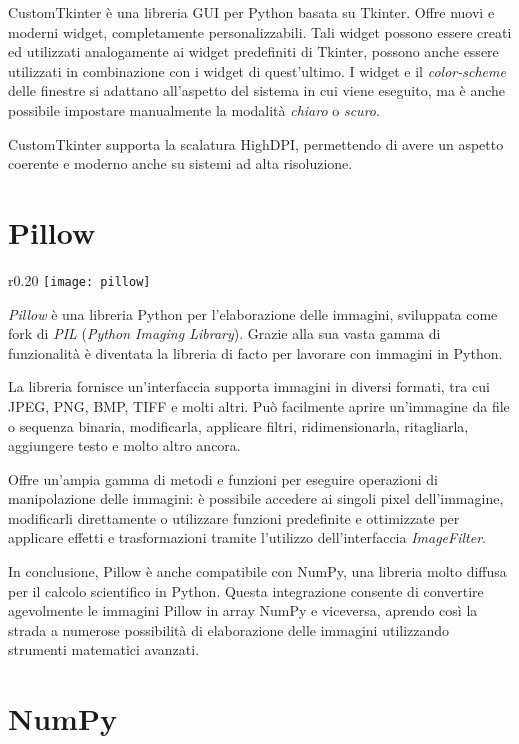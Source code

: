 {{CustomTkinter è una libreria GUI per Python basata su Tkinter. Offre nuovi e moderni widget, completamente personalizzabili. Tali widget possono essere creati ed utilizzati analogamente ai widget predefiniti di Tkinter, possono anche essere utilizzati in combinazione con i widget di quest'ultimo. I widget e il \textit{color-scheme} delle finestre si adattano all'aspetto del sistema in cui viene eseguito, ma è anche possibile impostare manualmente la modalità \textit{chiaro} o \textit{scuro}.

CustomTkinter supporta la scalatura HighDPI, permettendo di avere un aspetto coerente e moderno anche su sistemi ad alta risoluzione.

{\section{Pillow}
	
	\begin{wrapfigure}{r}{0.20\textwidth}
		\centering
		\texttt{[image: pillow]}
	\end{wrapfigure}
	\textit{Pillow} è una libreria Python per l'elaborazione delle immagini, sviluppata come fork di \textit{PIL} (\textit{Python Imaging Library}). Grazie alla sua vasta gamma di funzionalità è diventata la libreria di facto per lavorare con immagini in Python.
	
	La libreria fornisce un'interfaccia supporta immagini in diversi formati, tra cui JPEG, PNG, BMP, TIFF e molti altri. Può facilmente aprire un'immagine da file o sequenza binaria, modificarla, applicare filtri, ridimensionarla, ritagliarla, aggiungere testo e molto altro ancora.
	
	Offre un'ampia gamma di metodi e funzioni per eseguire operazioni di manipolazione delle immagini: è possibile accedere ai singoli pixel dell'immagine, modificarli direttamente o utilizzare funzioni predefinite e ottimizzate per applicare effetti e trasformazioni tramite l'utilizzo dell'interfaccia \textit{ImageFilter}.
	
	In conclusione, Pillow è anche compatibile con NumPy, una libreria molto diffusa per il calcolo scientifico in Python. Questa integrazione consente di convertire agevolmente le immagini Pillow in array NumPy e viceversa, aprendo così la strada a numerose possibilità di elaborazione delle immagini utilizzando strumenti matematici avanzati.

{\section{NumPy}
	
}}}}
